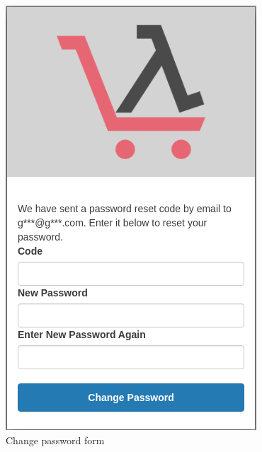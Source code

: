 \begin{figure}[!ht]
    \caption{Change password form}
    \vspace{10px}
    \includegraphics[scale=0.3]{../../../../Images/userManual/changingPWD.png}
    \centering
\end{figure}

